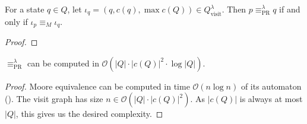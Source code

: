 \begin{theorem}
	For a state $q \in Q$, let $\iota_q = (q, c(q), \max c(Q)) \in Q_\text{visit}^\lambda$. Then $p \equiv_\text{PR}^\lambda q$ if and only if $\iota_p \equiv_M \iota_q$.
\end{theorem}

\begin{proof}
\end{proof}

\begin{theorem}
	$\equiv_\text{PR}^\lambda$ can be computed in $\mathcal{O}(|Q| \cdot |c(Q)|^2 \cdot \log |Q|)$.
\end{theorem}

\begin{proof}
	Moore equivalence can be computed in time $\mathcal{O}(n \log n)$ of its automaton (\cite{Hopcroft1971}). The visit graph has size $n \in \mathcal{O}(|Q| \cdot |c(Q)|^2)$. As $|c(Q)|$ is always at most $|Q|$, this gives us the desired complexity.
\end{proof}